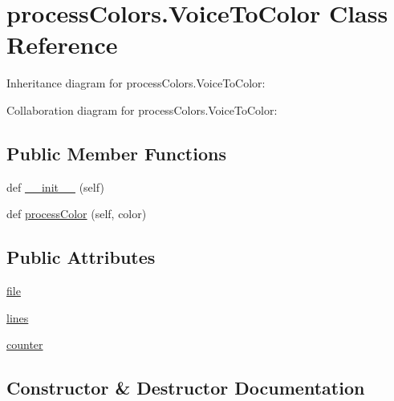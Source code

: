 \hypertarget{classprocessColors_1_1VoiceToColor}{}\section{process\+Colors.\+Voice\+To\+Color Class Reference}
\label{classprocessColors_1_1VoiceToColor}


Inheritance diagram for process\+Colors.\+Voice\+To\+Color\+:


Collaboration diagram for process\+Colors.\+Voice\+To\+Color\+:
\subsection*{Public Member Functions}
\begin{DoxyCompactItemize}
\item 
def \hyperlink{classprocessColors_1_1VoiceToColor_abe7cd55778b568c1902f04d1fb6f83f1}{\+\_\+\+\_\+init\+\_\+\+\_\+} (self)
\item 
def \hyperlink{classprocessColors_1_1VoiceToColor_a76d0439d776fc090dd47bdfad6dbabd7}{process\+Color} (self, color)
\end{DoxyCompactItemize}
\subsection*{Public Attributes}
\begin{DoxyCompactItemize}
\item 
\hyperlink{classprocessColors_1_1VoiceToColor_a09fae3fac63c4ad02c417c20301efd2b}{file}
\item 
\hyperlink{classprocessColors_1_1VoiceToColor_a80502bad87c17548da07d9d4e7960fff}{lines}
\item 
\hyperlink{classprocessColors_1_1VoiceToColor_abe1c0c0f2e7754f4e3d8995a16feea1a}{counter}
\end{DoxyCompactItemize}


\subsection{Constructor \& Destructor Documentation}
\mbox{\label{classprocessColors_1_1VoiceToColor_abe7cd55778b568c1902f04d1fb6f83f1}} 
